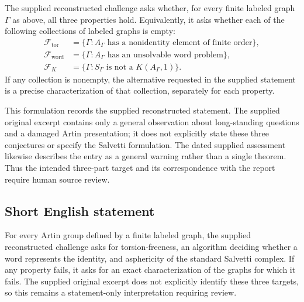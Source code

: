 \documentclass[11pt]{article}
\begin{document}
The supplied reconstructed challenge asks whether, for every finite labeled graph \(\Gamma\) as above, all three properties hold. Equivalently, it asks whether each of the following collections of labeled graphs is empty:
\[
\begin{aligned}
\mathcal F_{\mathrm{tor}}&=\{\Gamma:A_\Gamma\text{ has a nonidentity element of finite order}\},\\
\mathcal F_{\mathrm{word}}&=\{\Gamma:A_\Gamma\text{ has an unsolvable word problem}\},\\
\mathcal F_{K}&=\{\Gamma:S_\Gamma\text{ is not a }K(A_\Gamma,1)\}.
\end{aligned}
\]
If any collection is nonempty, the alternative requested in the supplied statement is a precise characterization of that collection, separately for each property.

This formulation records the supplied reconstructed statement. The supplied original excerpt contains only a general observation about long-standing questions and a damaged Artin presentation; it does not explicitly state these three conjectures or specify the Salvetti formulation. The dated supplied assessment likewise describes the entry as a general warning rather than a single theorem. Thus the intended three-part target and its correspondence with the report require human source review.
\subsection{Short English statement}
For every Artin group defined by a finite labeled graph, the supplied reconstructed challenge asks for torsion-freeness, an algorithm deciding whether a word represents the identity, and asphericity of the standard Salvetti complex. If any property fails, it asks for an exact characterization of the graphs for which it fails. The supplied original excerpt does not explicitly identify these three targets, so this remains a statement-only interpretation requiring review.
\end{document}
